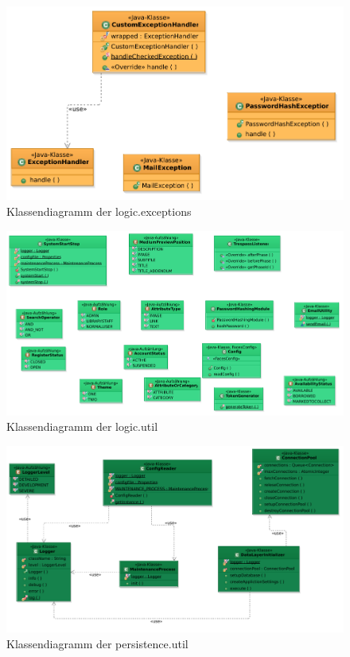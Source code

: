 \documentclass{article}
\begin{document}
\begin{figure}[H]
		\centering
		\includegraphics[width = 52em]{Klassendiagramm-ExceptionsObere}
		\caption{Klassendiagramm der logic.exceptions}
	\end{figure}

\begin{figure}[H]
\hypertarget{PhaseListener}{}
\hypertarget{Hash}{}
		\centering
		\includegraphics[width = 52em]{KlassendiagrammUtilObere}
		\caption{Klassendiagramm der logic.util}
	\end{figure}


\begin{figure}[H]
		\centering
		\includegraphics[width = 52em]{KlassendiagrammUtilunten}
		\caption{Klassendiagramm der persistence.util}
	\end{figure}
\end{document}
